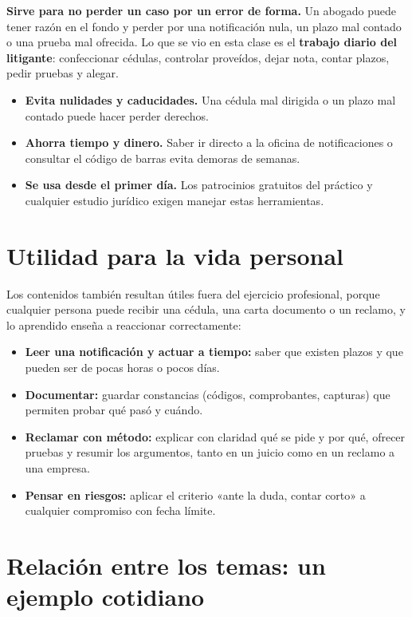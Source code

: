 \documentclass[12pt,oneside]{book}
\begin{document}
\begin{important}
\textbf{Sirve para no perder un caso por un error de forma.} Un abogado puede tener razón en el fondo y perder por una notificación nula, un plazo mal contado o una prueba mal ofrecida. Lo que se vio en esta clase es el \textbf{trabajo diario del litigante}: confeccionar cédulas, controlar proveídos, dejar nota, contar plazos, pedir pruebas y alegar.
\end{important}

\begin{itemize}
    \item \textbf{Evita nulidades y caducidades.} Una cédula mal dirigida o un plazo mal contado puede hacer perder derechos.
    \item \textbf{Ahorra tiempo y dinero.} Saber ir directo a la oficina de notificaciones o consultar el código de barras evita demoras de semanas.
    \item \textbf{Se usa desde el primer día.} Los patrocinios gratuitos del práctico y cualquier estudio jurídico exigen manejar estas herramientas.
\end{itemize}

\section{Utilidad para la vida personal}

Los contenidos también resultan útiles fuera del ejercicio profesional, porque cualquier persona puede recibir una cédula, una carta documento o un reclamo, y lo aprendido enseña a reaccionar correctamente:

\begin{itemize}
    \item \textbf{Leer una notificación y actuar a tiempo:} saber que existen plazos y que pueden ser de pocas horas o pocos días.
    \item \textbf{Documentar:} guardar constancias (códigos, comprobantes, capturas) que permiten probar qué pasó y cuándo.
    \item \textbf{Reclamar con método:} explicar con claridad qué se pide y por qué, ofrecer pruebas y resumir los argumentos, tanto en un juicio como en un reclamo a una empresa.
    \item \textbf{Pensar en riesgos:} aplicar el criterio «ante la duda, contar corto» a cualquier compromiso con fecha límite.
\end{itemize}

\section{Relación entre los temas: un ejemplo cotidiano}
\end{document}
